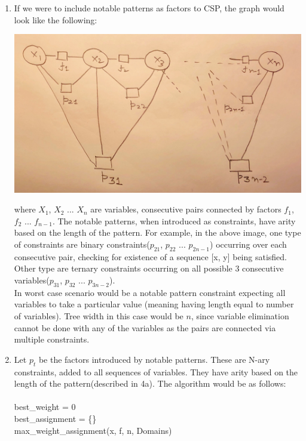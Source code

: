 \documentclass[12pt]{article}
\begin{document}
\begin{enumerate}[label=(\alph*)]
\item If we were to include notable patterns as factors to CSP, the graph would look like the following:
  \begin{center}
  \includegraphics[scale=0.2]{IMG_2245.jpg}
  \end{center}
  where $X_1$, $X_2$ ... $X_n$ are variables, consecutive pairs connected by factors $f_1$, $f_2$ ... $f_{n-1}$. The notable patterns, when introduced as constraints, have arity based on the length of the pattern. For example, in the above image, one type of constraints are binary constraints($p_{21}$, $p_{22}$ ... $p_{2n-1}$) occurring over each consecutive pair, checking for existence of a sequence [x, y] being satisfied. Other type are ternary constraints occurring on all possible 3 consecutive variables($p_{31}$, $p_{32}$ ... $p_{3n-2}$). \\
  In worst case scenario would be a notable pattern constraint expecting all variables to take a particular value (meaning having length equal to number of variables). Tree width in this case would be $n$, since variable elimination cannot be done with any of the variables as the pairs are connected via multiple constraints.
  
  \item Let $p_t$ be the factors introduced by notable patterns. These are N-ary constraints, added to all sequences of variables. They have arity based on the length of the pattern(described in 4a). The algorithm would be as follows: \\ \\
  best\_weight = 0 \\
  best\_assignment = \{\} \\
  max\_weight\_assignment(x, f, n, Domains)
  

\end{enumerate}
\end{document}
